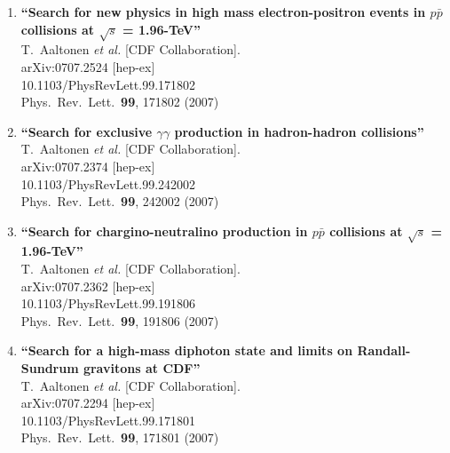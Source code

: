 \documentclass{article}
\begin{document}
\begin{enumerate}
\item%
{\bf ``Search for new physics in high mass electron-positron events in $p \bar{p}$ collisions at $\sqrt{s}$ = 1.96-TeV''}
  \\{}T.~Aaltonen {\it et al.}  [CDF Collaboration].
  \\{}arXiv:0707.2524 [hep-ex]
    \\{}10.1103/PhysRevLett.99.171802
\\{}Phys.\ Rev.\ Lett.\  {\bf 99}, 171802 (2007) %


\item%
{\bf ``Search for exclusive $\gamma \gamma$ production in hadron-hadron collisions''}
  \\{}T.~Aaltonen {\it et al.}  [CDF Collaboration].
  \\{}arXiv:0707.2374 [hep-ex]
    \\{}10.1103/PhysRevLett.99.242002
\\{}Phys.\ Rev.\ Lett.\  {\bf 99}, 242002 (2007) %


\item%
{\bf ``Search for chargino-neutralino production in $p \bar{p}$ collisions at $\sqrt{s}$ = 1.96-TeV''}
  \\{}T.~Aaltonen {\it et al.}  [CDF Collaboration].
  \\{}arXiv:0707.2362 [hep-ex]
    \\{}10.1103/PhysRevLett.99.191806
\\{}Phys.\ Rev.\ Lett.\  {\bf 99}, 191806 (2007) %


\item%
{\bf ``Search for a high-mass diphoton state and limits on Randall-Sundrum gravitons at CDF''}
  \\{}T.~Aaltonen {\it et al.}  [CDF Collaboration].
  \\{}arXiv:0707.2294 [hep-ex]
    \\{}10.1103/PhysRevLett.99.171801
\\{}Phys.\ Rev.\ Lett.\  {\bf 99}, 171801 (2007) %



\end{enumerate}
\end{document}
